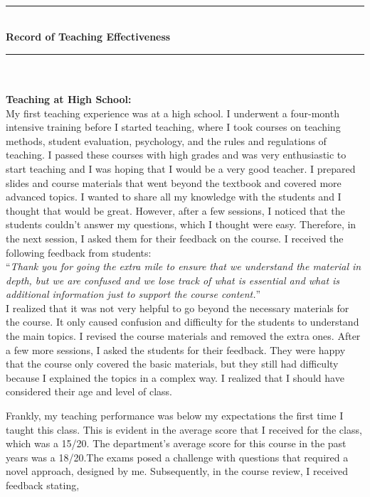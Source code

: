 \newpage
  \thispagestyle{empty}
 \phantom \quad \\
\hrule \phantom \quad  \vspace*{1\baselineskip}  \\
 {\bf Record of Teaching Effectiveness}
 \vspace*{1\baselineskip}  \hrule \phantom \quad \\
\vspace*{3\baselineskip} \phantom \quad \\
{\bf Teaching at High School:}\\ 

My first teaching experience was at a high school. I underwent a four-month intensive training before I started teaching, where I took courses on teaching methods, student evaluation, psychology, and the rules and regulations of teaching. I passed these courses with high grades and was very enthusiastic to start teaching and I was hoping that I would be a very good teacher.  I prepared slides and course materials that went beyond the textbook and covered more advanced topics. I wanted to share all my knowledge with the students and I thought that would be great. However, after a few sessions, I noticed that the students couldn’t answer my questions, which I thought were easy. Therefore, in the next session, I asked them for their feedback on the course.
I received the following feedback from students:\\

“\emph {Thank you for going the extra mile to ensure that we understand the material in depth, but we are confused and we lose track of what is essential and what is additional information just to support the course content.}” \\

I realized that it was not very helpful to go beyond the necessary materials for the course. It only caused confusion and difficulty for the students to understand the main topics. I revised the course materials and removed the extra ones. After a few more sessions, I asked the students for their feedback. They were happy that the course only covered the basic materials, but they still had difficulty because I explained the topics in a complex way. I realized that I should have considered their age and level of class.

Frankly, my teaching performance was below my expectations the first time I taught this class. This is evident in the average score that I received for the class, which was a 15/20. The department’s average score for this course in the past years was a 18/20.The exams posed a challenge with questions that required a novel approach, designed by me. Subsequently, in the course review, I received feedback stating, \\

